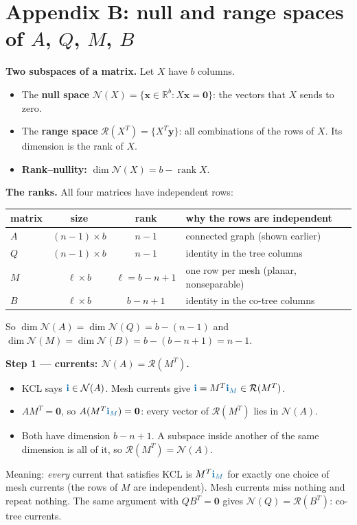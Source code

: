 \documentclass[11pt,a4paper]{article}
\newcommand{\Icol}[1]{\textcolor{ccur}{#1}}
\begin{document}
\clearpage
\section*{Appendix B: null and range spaces of $A$, $Q$, $M$, $B$}

\textbf{Two subspaces of a matrix.} Let $X$ have $b$ columns.
\begin{itemize}
  \item The \textbf{null space} $\mathcal{N}(X) = \{\mathbf{x} \in \mathbb{R}^b : X\mathbf{x} = \mathbf{0}\}$:
        the vectors that $X$ sends to zero.
  \item The \textbf{range space} $\mathcal{R}(X^T) = \{X^T\mathbf{y}\}$: all combinations of the
        rows of $X$. Its dimension is the rank of $X$.
  \item \textbf{Rank--nullity:} $\dim \mathcal{N}(X) = b - \operatorname{rank} X$.
\end{itemize}

\textbf{The ranks.} All four matrices have independent rows:
\begin{center}
\renewcommand{\arraystretch}{1.2}
\begin{tabular}{@{}l c c l@{}}
\toprule
matrix & size & rank & why the rows are independent\\
\midrule
$A$ & $(n-1)\times b$ & $n-1$   & connected graph (shown earlier)\\
$Q$ & $(n-1)\times b$ & $n-1$   & identity in the tree columns\\
$M$ & $\ell\times b$  & $\ell = b-n+1$ & one row per mesh (planar, nonseparable)\\
$B$ & $\ell\times b$  & $b-n+1$ & identity in the co-tree columns\\
\bottomrule
\end{tabular}
\end{center}
So $\dim\mathcal{N}(A) = \dim\mathcal{N}(Q) = b - (n-1)$ and
$\dim\mathcal{N}(M) = \dim\mathcal{N}(B) = b - (b-n+1) = n-1$.

\textbf{Step 1 --- currents: $\mathcal{N}(A) = \mathcal{R}(M^T)$.}
\begin{itemize}
  \item KCL says $\Icol{\mathbf{i}} \in \mathcal{N}(A)$. Mesh currents give
        $\Icol{\mathbf{i}} = M^T\Icol{\mathbf{i}_M} \in \mathcal{R}(M^T)$.
  \item $AM^T = \mathbf{0}$, so $A(M^T\Icol{\mathbf{i}_M}) = \mathbf{0}$: every vector of
        $\mathcal{R}(M^T)$ lies in $\mathcal{N}(A)$.
  \item Both have dimension $b-n+1$. A subspace inside another of the same dimension is all of
        it, so $\mathcal{R}(M^T) = \mathcal{N}(A)$.
\end{itemize}
Meaning: \emph{every} current that satisfies KCL is $M^T\Icol{\mathbf{i}_M}$ for exactly one
choice of mesh currents (the rows of $M$ are independent). Mesh currents miss nothing and repeat nothing. The same argument with
$QB^T = \mathbf{0}$ gives $\mathcal{N}(Q) = \mathcal{R}(B^T)$: co-tree currents.
\end{document}
